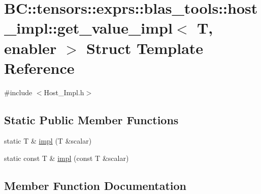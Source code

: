 \hypertarget{structBC_1_1tensors_1_1exprs_1_1blas__tools_1_1host__impl_1_1get__value__impl}{}\section{BC\+:\+:tensors\+:\+:exprs\+:\+:blas\+\_\+tools\+:\+:host\+\_\+impl\+:\+:get\+\_\+value\+\_\+impl$<$ T, enabler $>$ Struct Template Reference}
\label{structBC_1_1tensors_1_1exprs_1_1blas__tools_1_1host__impl_1_1get__value__impl}


{\ttfamily \#include $<$Host\+\_\+\+Impl.\+h$>$}

\subsection*{Static Public Member Functions}
\begin{DoxyCompactItemize}
\item 
static T \& \hyperlink{structBC_1_1tensors_1_1exprs_1_1blas__tools_1_1host__impl_1_1get__value__impl_afbb59447aebab96eea9e599855fe6d48}{impl} (T \&scalar)
\item 
static const T \& \hyperlink{structBC_1_1tensors_1_1exprs_1_1blas__tools_1_1host__impl_1_1get__value__impl_a2091c39a0d4b9731930b354c095da22d}{impl} (const T \&scalar)
\end{DoxyCompactItemize}


\subsection{Member Function Documentation}
